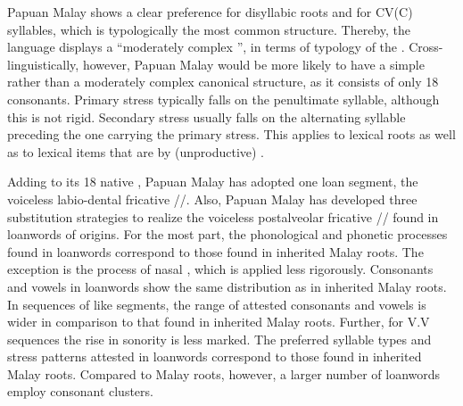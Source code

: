 Papuan Malay shows a clear preference for disyllabic roots and for CV(C) syllables, which is typologically the most common structure. Thereby, the language displays a “moderately complex ”, in terms of  typology of the . Cross-linguistically, however, Papuan Malay would be more likely to have a simple rather than a moderately complex canonical structure, as it consists of only 18 consonants. Primary stress typically falls on the penultimate syllable, although this  is not rigid. Secondary stress usually falls on the alternating syllable preceding the one carrying the primary stress. This  applies to lexical roots as well as to lexical items that are  by (unproductive) .



Adding to its 18 native , Papuan Malay has adopted one loan segment, the voiceless labio-dental fricative //. Also, Papuan Malay has developed three substitution strategies to realize the voiceless postalveolar fricative // found in loanwords of  origins. For the most part, the phonological and phonetic processes found in loanwords correspond to those found in inherited Malay roots. The exception is the process of nasal , which is applied less rigorously. Consonants and vowels in loanwords show the same distribution as in inherited Malay roots. In sequences of like segments, the range of attested consonants and vowels is wider in comparison to that found in inherited Malay roots. Further, for V.V sequences the rise in sonority is less marked. The preferred syllable types and stress patterns attested in loanwords correspond to those found in inherited Malay roots. Compared to Malay roots, however, a larger number of loanwords employ consonant clusters.